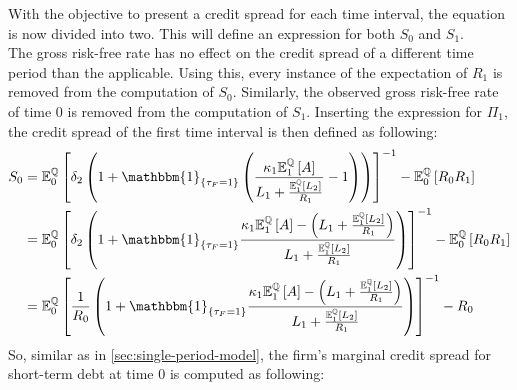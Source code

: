 \documentclass[main.tex]{subfiles}
\begin{document}
        With the objective to present a credit spread for each time interval, the equation is now divided into two.
        This will define an expression for both $S_0$ and $S_1$.
        \\
        The gross risk-free rate has no effect on the credit spread of a different time period than the applicable.
        Using this, every instance of the expectation of $R_1$ is removed from the computation of $S_0$.
        Similarly, the observed gross risk-free rate of time 0 is removed from the computation of $S_1$.
        Inserting the expression for $\Pi_1$, the credit spread of the first time interval is then defined as following: 
        \begin{align}
            S_0 &=
            \mathbb{E}_{0}^{\rnmeasure}\left[
                \delta_2\left(
                    1
                    + \mathbbm{1}_{\{\tau_{F} = 1\}}\left(
                        \frac{\kappa_1 \mathbb{E}_{1}^{\rnmeasure}\left[A\right]}{L_1 + \frac{\mathbb{E}_{1}^{\rnmeasure}\left[L_2\right]}{R_1}} - 1
                    \right)
                \right)
            \right]^{-1} - \mathbb{E}_{0}^{\rnmeasure}\left[R_0 R_1\right]
            \nonumber
            \\
            &=
            \mathbb{E}_{0}^{\rnmeasure}\left[
                \delta_2 \left(
                    1
                    + \mathbbm{1}_{\{\tau_{F} = 1\}}
                    \frac{
                        \kappa_1 \mathbb{E}_{1}^{\rnmeasure}\left[A\right] - \left(L_1 + \frac{\mathbb{E}_{1}^{\rnmeasure}\left[L_2\right]}{R_1}\right)
                    }{
                        L_1 + \frac{\mathbb{E}_{1}^{\rnmeasure}\left[L_2\right]}{R_1}
                    }
                \right)
            \right]^{-1} - \mathbb{E}_{0}^{\rnmeasure}\left[R_0 R_1\right]
            \nonumber
            \\
            &=
            \mathbb{E}_{0}^{\rnmeasure}\left[
                \frac{1}{R_0} \left(
                    1
                    + \mathbbm{1}_{\{\tau_{F} = 1\}}
                    \frac{
                        \kappa_1 \mathbb{E}_{1}^{\rnmeasure}\left[A\right] - \left(L_1 + \frac{\mathbb{E}_{1}^{\rnmeasure}\left[L_2\right]}{R_1}\right)
                    }{
                        L_1 + \frac{\mathbb{E}_{1}^{\rnmeasure}\left[L_2\right]}{R_1}
                    }
                \right)
            \right]^{-1} - R_0
            \nonumber
        \end{align}
        So, similar as in \cref{sec:single-period-model}, the firm's marginal credit spread for short-term debt at time 0 is computed as following:
\end{document}
